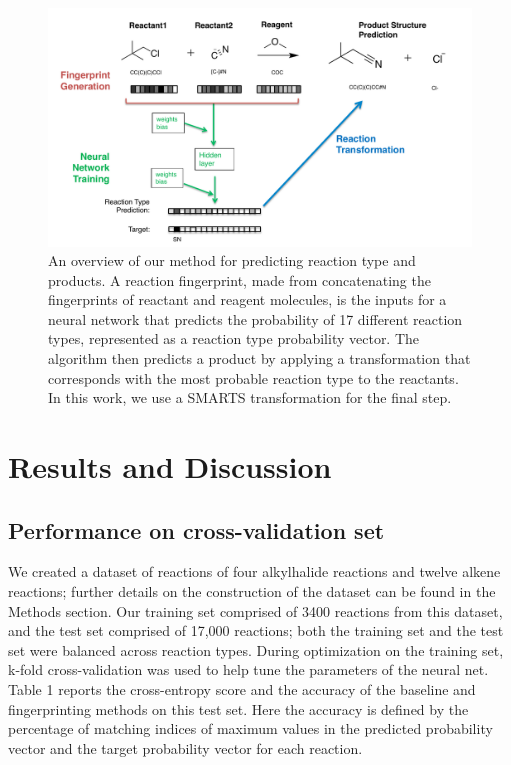 \begin{figure}
\begin{center}
\includegraphics[width=0.9\columnwidth]{Overview}
\caption[Summary of Reaction Prediction Method]{An overview of our method for predicting reaction type and products. A reaction fingerprint, made from concatenating the fingerprints of reactant and reagent molecules, is the inputs for a neural network that predicts the probability of 17 different reaction types, represented as a reaction type probability vector. The algorithm then predicts a product by applying a transformation that corresponds with the most probable reaction type to the reactants. In this work, we use a SMARTS transformation for the final step.}
\label{Fig:PredictionOverview}
\end{center}
\end{figure}

 
\section{Results and Discussion}

\subsection{Performance on cross-validation set}

We created a dataset of reactions of four alkylhalide reactions and twelve alkene reactions; further details on the construction of the dataset can be found in the Methods section. Our training set comprised of 3400 reactions from this dataset, and the test set comprised of 17,000 reactions; both the training set and the test set were balanced across reaction types. During optimization on the training set, k-fold cross-validation was used to help tune the parameters of the neural net. Table 1 reports the cross-entropy score and the accuracy of the baseline and fingerprinting methods on this test set. Here the accuracy is defined by the percentage of matching indices of maximum values in the predicted probability vector and the target probability vector for each reaction.

